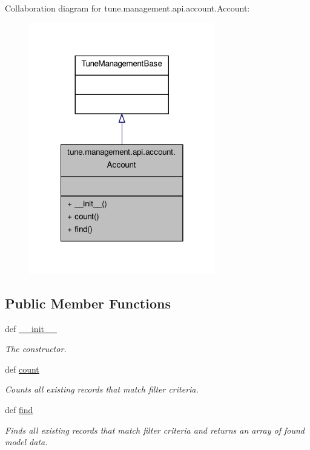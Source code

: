 Collaboration diagram for tune.\-management.\-api.\-account.\-Account\-:
\nopagebreak
\begin{figure}[H]
\begin{center}
\leavevmode
\includegraphics[width=230pt]{classtune_1_1management_1_1api_1_1account_1_1Account__coll__graph}
\end{center}
\end{figure}
\subsection*{Public Member Functions}
\begin{DoxyCompactItemize}
\item 
def \hyperlink{classtune_1_1management_1_1api_1_1account_1_1Account_a5dd49f5f497e7ffd0c5fdb6ca2c0a5c2}{\-\_\-\-\_\-init\-\_\-\-\_\-}
\begin{DoxyCompactList}\small\item\em The constructor. \end{DoxyCompactList}\item 
def \hyperlink{classtune_1_1management_1_1api_1_1account_1_1Account_a4a9a272db7dff634ea1e48df30a0b4f4}{count}
\begin{DoxyCompactList}\small\item\em Counts all existing records that match filter criteria. \end{DoxyCompactList}\item 
def \hyperlink{classtune_1_1management_1_1api_1_1account_1_1Account_af37c9d36cde138ff763e9a2b94b6218f}{find}
\begin{DoxyCompactList}\small\item\em Finds all existing records that match filter criteria and returns an array of found model data. \end{DoxyCompactList}\end{DoxyCompactItemize}


